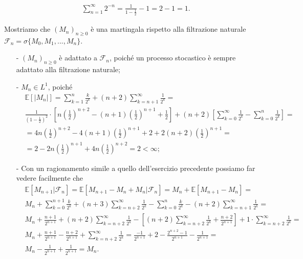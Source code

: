 \documentclass[11pt,largemargins]{homework}
\begin{document}
\begin{enumerate}
\begin{itemize}
\begin{align*}
&\sum_{n=1}^{\infty}2^{-n}=\frac{1}{1-\frac{1}{2}} - 1= 2-1= 1.
\end{align*}
\end{itemize}
Mostriamo che $\left(M_{n}\right)_{n\geq 0}$ è una martingala rispetto alla filtrazione naturale \\$\mathcal{F}_{n}=\sigma\{M_{0},M_{1},...,M_{n}\}$.
 \begin{itemize}
 \item[-]
 $\left(M_{n}\right)_{n\geq 0}$ è adattato a $\mathcal{F}_{n}$, poiché un processo stocastico è sempre adattato alla filtrazione naturale;
 \item[-]
 $M_{n}\in L^{1}$, poiché
 \begin{align*}
  &\mathbb{E}[\lvert M_n \lvert] = \sum_{k=1}^{n} \frac{k}{2^k} + (n+2)\sum_{k=n+1}^{\infty} \frac{1}{2^k}=\\ 
&\frac{1}{\left(1-\frac{1}{2}\right)^2}\cdot \left[n\left(\frac{1}{2}\right)^{n+2}-(n+1)\left(\frac{1}{2}\right)^{n+1} +\frac{1}{2}\right]+(n+2)\left[\sum_{k=0}^{\infty} \frac{1}{2^k}-\sum_{k=0}^{n} \frac{1}{2^k}\right]=\\
 & =4n\left(\frac{1}{2}\right)^{n+2} -4(n+1)\left(\frac{1}{2}\right)^{n+1}+2+2(n+2)\left(\frac{1}{2}\right)^{n+1} = \\
 & =2 -2n\left(\frac{1}{2}\right)^{n+1}+4n\left(\frac{1}{2}\right)^{n+2}=2 < \infty; 
   \end{align*}
   \item[-]
   Con un ragionamento simile a quello dell'esercizio precedente possiamo far vedere facilmente che  
   \begin{align*}
&\mathbb{E}[M_{n+1} \lvert \mathcal{F}_n] = \mathbb{E}[M_{n+1}-M_{n}+M_{n} \lvert \mathcal{F}_{n}]= M_n + \mathbb{E}[M_{n+1} - M_n] =\\
&M_n+\sum_{k=0}^{n+1}\frac{k}{2^k}+(n+3)\sum_{k=n+2}^{\infty}\frac{1}{2^k}-\sum_{k=0}^{n}\frac{k}{2^k}-(n+2)\sum_{k=n+1}^{\infty}\frac{1}{2^k}=\\
&M_n + \frac{n+1}{2^{n+1}} + (n+2)\sum_{k=n+2}^\infty \frac{1}{2^k}-\left[(n+2)\sum_{k=n+2}^\infty \frac{1}{2^k}+\frac{n+2}{2^{n+1}}\right] + 1\cdot\sum_{k=n+2}^\infty \frac{1}{2^k} = \\
&M_n + \frac{n+1}{2^{n+1}} - \frac{n+2}{2^{n+1}} + \sum_{k=n+2}^\infty \frac{1}{2^k} = \frac{-1}{2^{n+1}}+2 - \frac{2^{n+2}-1}{2^{n+1}}-\frac{1}{2^{n+1}}=\\
&M_n -\frac{1}{2^{n+1}}+\frac{1}{2^{n+1}}=M_n.
   \end{align*}



\end{itemize}
\end{enumerate}
\end{document}
